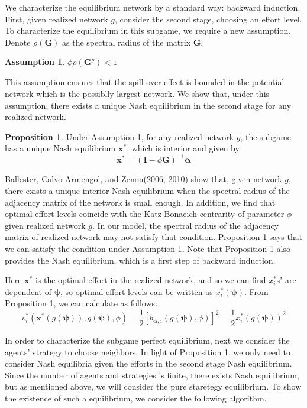 \documentclass[12pt]{article}
\theoremstyle{definition}
\newtheorem{proposition}{Proposition}
\newtheorem{assumption}{Assumption}
\begin{document}
We characterize the equilibrium network by a standard way: backward induction.
First, given realized network $g$, consider the second stage, choosing an effort level.
To characterize the equilibrium in this subgame, we require a new assumption.
Denote $\rho (\bm{G})$ as the spectral radius of the matrix $\bm{G}$.

\begin{assumption}
$\phi \rho(\bm{G}^p) < 1$
\end{assumption}

This assumption ensures that the spill-over effect is bounded in the potential network which is the possiblly largest network.
We show that, under this assumption, there exists a unique Nash equilibrium in the second stage for any realized network.

\begin{proposition}
Under Assumption 1, for any realized network $g$, the subgame has a unique Nash equilibrium $\bm{x}^*$, which is interior and given by
\[ \bm{x}^* = {(\bm{I} - \phi \bm{G})}^{-1} \bm{\alpha} \]
\end{proposition}

Ballester, Calvo-Armengol, and Zenou(2006, 2010) show that, given network $g$, there exists a unique interior Nash equilibrium when the spectral radius of the adjacency matrix of the network is small enough.
In addition, we find that optimal effort levels coincide with the Katz-Bonacich centrarity of parameter $\phi$ given realized network $g$.
In our model, the spectral radius of the adjacency matrix of realized network may not satisfy that condition.
Proposition 1 says that we can satisfy the condition under Assumption 1.
Note that Proposition 1 also provides the Nash equilibrium, which is a first step of backward induction.

Here $\bm{x}^*$ is the optimal effort in the realized network, and so we can find $x_i^*$s' are dependent of $\bm{\psi}$, so optimal effort levels can be written as $x_i^*(\bm{\psi})$.
From Proposition 1, we can calculate as follows:
\begin{equation}
	\label{opteff}
	v_i^*(\bm{x}^*(g(\bm{\psi})), g(\bm{\psi}), \phi) = \frac{1}{2} {[b_{\bm{\alpha}, i}(g(\bm{\psi}), \phi)]}^2 = \frac{1}{2} {x_i^*(g(\bm{\psi}))}^2
\end{equation}

In order to characterize the subgame perfect equilibrium, next we consider the agents' strategy to choose neighbors.
In light of Proposition 1, we only need to consider Nash equilibria given the efforts in the second stage Nash equilibrium.
Since the number of agents and strategies is finite, there exists Nash equilibrium, but as mentioned above, we will consider the pure staretegy equilibrium.
To show the existence of such a equilibrium, we consider the following algorithm.
\end{document}
